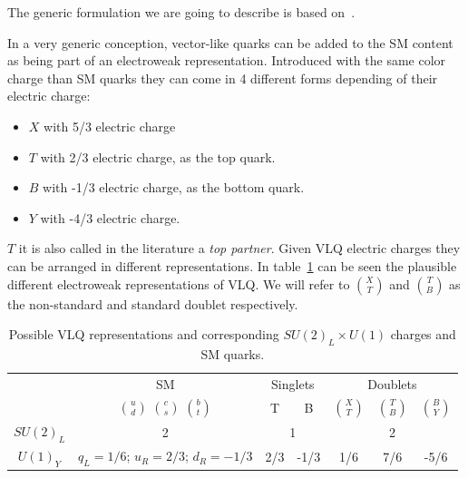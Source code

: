 The generic formulation we are going to describe is based on~\cite{Buchkremer:2013bha, Cacciapaglia:2011fx}.

In a very generic conception, vector-like quarks can be added to the SM content as being part of an electroweak representation. Introduced with the same color charge than SM quarks they can come in 4 different forms depending of their electric charge:
\begin{itemize}
\item $X$ with 5/3 electric charge
\item $T$ with 2/3 electric charge, as the top quark.
\item $B$ with -1/3 electric charge, as the bottom quark.
\item $Y$ with -4/3 electric charge.
\end{itemize}

$T$ it is also called in the literature a \textit{top partner}. Given VLQ electric charges they can be arranged in different representations. In table~\ref{tab:VLQRepre} can be seen the plausible different electroweak representations of VLQ. We will refer to $\binom{X}{T}$ and $\binom{T}{B}$ as the non-standard and standard doublet respectively.  

\begin{table}[htbH]
\label{tab:VLQRepre}
\begin{center}
\begin{tabular}{|c|c|c|c|c|c|c|}
\hline 
 & SM & \multicolumn{2}{c|}{Singlets} & \multicolumn{3}{c|}{Doublets} \\
 & $\binom{u}{d}$ $\binom{c}{s}$ $\binom{b}{t}$ & T & B & $\binom{X}{T}$ & $\binom{T}{B}$ & $\binom{B}{Y}$ \\ 
\hline
$SU(2)_{L}$ & 2 & \multicolumn{2}{c|}{1} & \multicolumn{3}{c|}{2} \\ \hline
$U(1)_{Y}$ & $q_{L}=1/6$; $u_{R}=2/3$; $d_{R}=-1/3$ & 2/3 & -1/3 & 1/6 & 7/6 & -5/6 \\
\hline
\end{tabular}
\caption{Possible VLQ representations and corresponding $SU(2)_{L}\times U(1)$ charges and SM quarks.}
\end{center}
\end{table}


